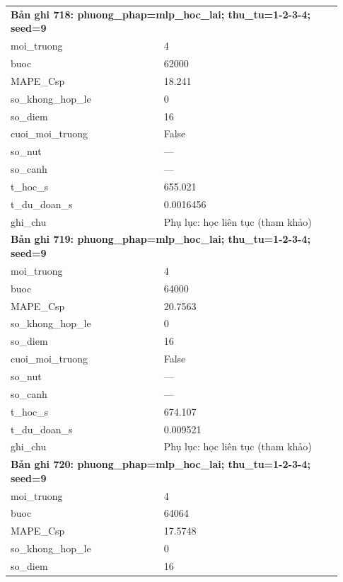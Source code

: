 \begin{longtable}{p{0.43\linewidth}p{0.50\linewidth}}
\midrule
\multicolumn{2}{p{0.95\linewidth}}{\textbf{Bản ghi 718: phuong\_phap=mlp\_hoc\_lai; thu\_tu=1-2-3-4; seed=9}} \\
moi\_\allowbreak truong & 4 \\
buoc & 62000 \\
MAPE\_\allowbreak Csp & 18.241 \\
so\_\allowbreak khong\_\allowbreak hop\_\allowbreak le & 0 \\
so\_\allowbreak diem & 16 \\
cuoi\_\allowbreak moi\_\allowbreak truong & False \\
so\_\allowbreak nut & — \\
so\_\allowbreak canh & — \\
t\_\allowbreak hoc\_\allowbreak s & 655.021 \\
t\_\allowbreak du\_\allowbreak doan\_\allowbreak s & 0.0016456 \\
ghi\_\allowbreak chu & Phụ lục: học liên tục (tham khảo) \\
\midrule
\multicolumn{2}{p{0.95\linewidth}}{\textbf{Bản ghi 719: phuong\_phap=mlp\_hoc\_lai; thu\_tu=1-2-3-4; seed=9}} \\
moi\_\allowbreak truong & 4 \\
buoc & 64000 \\
MAPE\_\allowbreak Csp & 20.7563 \\
so\_\allowbreak khong\_\allowbreak hop\_\allowbreak le & 0 \\
so\_\allowbreak diem & 16 \\
cuoi\_\allowbreak moi\_\allowbreak truong & False \\
so\_\allowbreak nut & — \\
so\_\allowbreak canh & — \\
t\_\allowbreak hoc\_\allowbreak s & 674.107 \\
t\_\allowbreak du\_\allowbreak doan\_\allowbreak s & 0.009521 \\
ghi\_\allowbreak chu & Phụ lục: học liên tục (tham khảo) \\
\midrule
\multicolumn{2}{p{0.95\linewidth}}{\textbf{Bản ghi 720: phuong\_phap=mlp\_hoc\_lai; thu\_tu=1-2-3-4; seed=9}} \\
moi\_\allowbreak truong & 4 \\
buoc & 64064 \\
MAPE\_\allowbreak Csp & 17.5748 \\
so\_\allowbreak khong\_\allowbreak hop\_\allowbreak le & 0 \\
so\_\allowbreak diem & 16 \\

\end{longtable}
